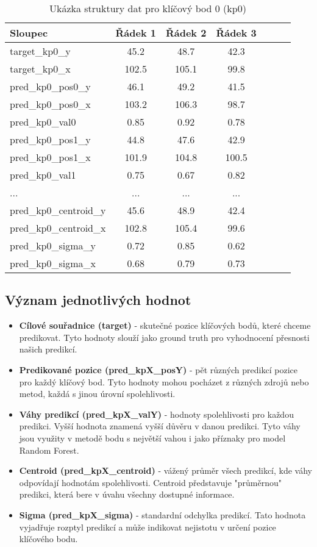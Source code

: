 \begin{table}[H]
\centering
\begin{tabular}{lcccccc}
\toprule
\textbf{Sloupec} & \textbf{Řádek 1} & \textbf{Řádek 2} & \textbf{Řádek 3} \\
\midrule
target\_kp0\_y & 45.2 & 48.7 & 42.3 \\
target\_kp0\_x & 102.5 & 105.1 & 99.8 \\
pred\_kp0\_pos0\_y & 46.1 & 49.2 & 41.5 \\
pred\_kp0\_pos0\_x & 103.2 & 106.3 & 98.7 \\
pred\_kp0\_val0 & 0.85 & 0.92 & 0.78 \\
pred\_kp0\_pos1\_y & 44.8 & 47.6 & 42.9 \\
pred\_kp0\_pos1\_x & 101.9 & 104.8 & 100.5 \\
pred\_kp0\_val1 & 0.75 & 0.67 & 0.82 \\
... & ... & ... & ... \\
pred\_kp0\_centroid\_y & 45.6 & 48.9 & 42.4 \\
pred\_kp0\_centroid\_x & 102.8 & 105.4 & 99.6 \\
pred\_kp0\_sigma\_y & 0.72 & 0.85 & 0.62 \\
pred\_kp0\_sigma\_x & 0.68 & 0.79 & 0.73 \\
\bottomrule
\end{tabular}
\caption{Ukázka struktury dat pro klíčový bod 0 (kp0)}
\label{tab:data_example}
\end{table}

\subsection{Význam jednotlivých hodnot}

\begin{itemize}
    \item \textbf{Cílové souřadnice (target)} - skutečné pozice klíčových bodů, které chceme predikovat. Tyto hodnoty slouží jako ground truth pro vyhodnocení přesnosti našich predikcí.
    
    \item \textbf{Predikované pozice (pred\_kpX\_posY)} - pět různých predikcí pozice pro každý klíčový bod. Tyto hodnoty mohou pocházet z různých zdrojů nebo metod, každá s jinou úrovní spolehlivosti.
    
    \item \textbf{Váhy predikcí (pred\_kpX\_valY)} - hodnoty spolehlivosti pro každou predikci. Vyšší hodnota znamená vyšší důvěru v danou predikci. Tyto váhy jsou využity v metodě bodu s největší vahou i jako příznaky pro model Random Forest.
    
    \item \textbf{Centroid (pred\_kpX\_centroid)} - vážený průměr všech predikcí, kde váhy odpovídají hodnotám spolehlivosti. Centroid představuje "průměrnou" predikci, která bere v úvahu všechny dostupné informace.
    
    \item \textbf{Sigma (pred\_kpX\_sigma)} - standardní odchylka predikcí. Tato hodnota vyjadřuje rozptyl predikcí a může indikovat nejistotu v určení pozice klíčového bodu.
\end{itemize}

